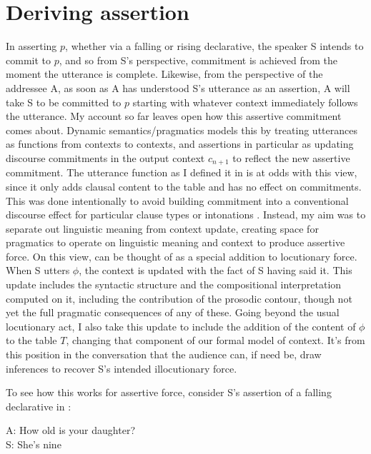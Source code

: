 \documentclass[output=paper,colorlinks,citecolor=brown]{langscibook}
\begin{document}
	
	
	
	
	
	
	
\section{Deriving assertion} \label{derive}
	
	In asserting $p$, whether via a falling or rising declarative, the speaker S intends to commit to $p$, and so from S's perspective, commitment is achieved from the moment the utterance is complete. Likewise, from the perspective of the addressee A, as soon as A has understood S's utterance as an assertion, A will take S to be committed to $p$ starting with whatever context immediately follows the utterance. My account so far leaves open how this assertive commitment comes about. Dynamic semantics/pragmatics models this by treating utterances as functions from contexts to contexts, and assertions in particular as updating discourse commitments in the output context $c_{n+1}$ to reflect the new assertive commitment. The utterance function as I defined it in  is at odds with this view, since it only adds clausal content to the table and has no effect on commitments. This was done intentionally to avoid building commitment into a conventional discourse effect for particular clause types or intonations \citep[\emph{pace}][]{farkas10, lauer13, farkas17, jeong18, rudin18, rudin22}. Instead, my aim was to separate out linguistic meaning from context update, creating space for pragmatics to operate on linguistic meaning and context to produce assertive force. On this view,  can be thought of as a special addition to locutionary force.  When S utters $\phi$, the context is updated with the fact of S having said it. This update includes the syntactic structure and the compositional interpretation computed on it, including the contribution of the prosodic contour, though not yet the full pragmatic consequences of any of these. Going beyond the usual locutionary act, I also take this update to include the addition of the content of $\phi$ to the table $T$, changing that component of our formal model of context. It's from this position in the conversation that the audience can, if need be, draw inferences to recover S's intended illocutionary force. 
	
	To see how this works for assertive force, consider S's assertion of a falling declarative in : 
	
	\exa A: How old is your daughter?\\
	S: She's nine\fall \label{fd}
	\z
	
\end{document}
